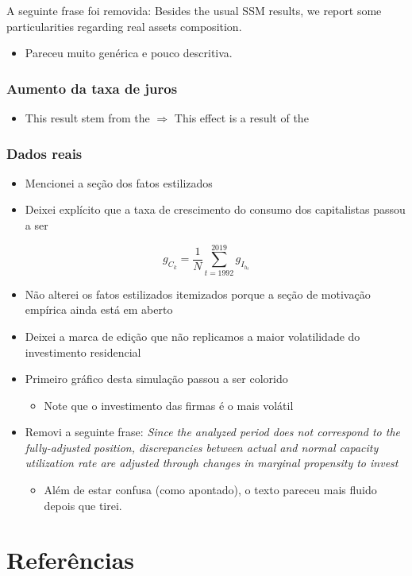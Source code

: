 \documentclass[11pt]{article}
\begin{document}
A seguinte frase foi removida: Besides the usual SSM results, we report some particularities regarding real assets composition.

\begin{itemize}
\item Pareceu muito genérica e pouco descritiva.
\end{itemize}


\subsubsection*{Aumento da taxa de juros}
\label{sec:org74e0867}
\begin{itemize}
\item This result stem from the \(\Rightarrow\) This effect is a result of the
\end{itemize}

\subsubsection*{Dados reais}
\label{sec:org8dffb25}

\begin{itemize}
\item Mencionei a seção dos fatos estilizados
\item Deixei explícito que a taxa de crescimento do consumo dos capitalistas passou a ser
\end{itemize}

\begin{equation}
  \label{gck_real}
  g_{C_k} = \frac{1}{N} \sum_{t=1992}^{2019} g_{I_{h_{t}}}
\end{equation}

\begin{itemize}
\item Não alterei os fatos estilizados itemizados porque a seção de motivação empírica ainda está em aberto
\item Deixei a marca de edição que não replicamos a maior volatilidade do investimento residencial
\item Primeiro gráfico desta simulação passou a ser colorido
\begin{itemize}
\item Note que o investimento das firmas é o mais volátil
\end{itemize}
\item Removi a seguinte frase: \emph{Since the analyzed period does not correspond to the fully-adjusted position, discrepancies between actual and normal capacity utilization rate are adjusted through changes in marginal propensity to invest}
\begin{itemize}
\item Além de estar confusa (como apontado), o texto pareceu mais fluido depois que tirei.
\end{itemize}
\end{itemize}

\section*{Referências}
\label{sec:org9d58dd1}
\printbibliography[heading=none]
\end{document}
